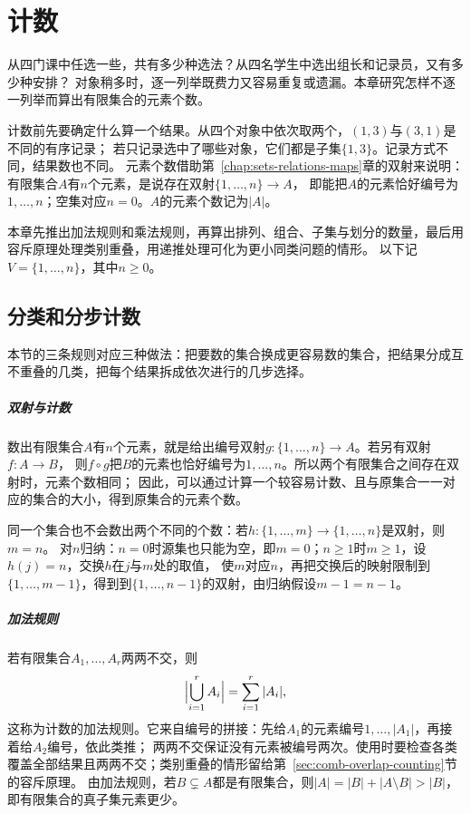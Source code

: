 \chapter{计数}
\label{chap:combinatorics}
\label{chap:counting}

从四门课中任选一些，共有多少种选法？从四名学生中选出组长和记录员，又有多少种安排？
对象稍多时，逐一列举既费力又容易重复或遗漏。本章研究怎样不逐一列举而算出有限集合的元素个数。

计数前先要确定什么算一个结果。从四个对象中依次取两个，$(1,3)$与$(3,1)$是不同的有序记录；
若只记录选中了哪些对象，它们都是子集$\{1,3\}$。记录方式不同，结果数也不同。
元素个数借助第~\ref{chap:sets-relations-maps}章的双射来说明：有限集合$A$有$n$个元素，是说存在双射$\{1,\ldots,n\}\to A$，
即能把$A$的元素恰好编号为$1,\ldots,n$；空集对应$n=0$。$A$的元素个数记为$|A|$。

本章先推出加法规则和乘法规则，再算出排列、组合、子集与划分的数量，最后用容斥原理处理类别重叠，用递推处理可化为更小同类问题的情形。
以下记$V=\{1,\ldots,n\}$，其中$n\geq0$。

\section{分类和分步计数}
\label{sec:comb-families-counting}
\label{sec:comb-finite-counting}
\label{sec:comb-decomposition-counting}
\label{sec:comb-classification-products}
\label{sec:comb-classification-counting}

本节的三条规则对应三种做法：把要数的集合换成更容易数的集合，把结果分成互不重叠的几类，把每个结果拆成依次进行的几步选择。

\paragraph{双射与计数}
数出有限集合$A$有$n$个元素，就是给出编号双射$g:\{1,\ldots,n\}\to A$。若另有双射$f:A\to B$，
则$f\circ g$把$B$的元素也恰好编号为$1,\ldots,n$。所以两个有限集合之间存在双射时，元素个数相同；
因此，可以通过计算一个较容易计数、且与原集合一一对应的集合的大小，得到原集合的元素个数。

同一个集合也不会数出两个不同的个数：若$h:\{1,\ldots,m\}\to\{1,\ldots,n\}$是双射，则$m=n$。
对$n$归纳：$n=0$时源集也只能为空，即$m=0$；$n\geq1$时$m\geq1$，设$h(j)=n$，交换$h$在$j$与$m$处的取值，
使$m$对应$n$，再把交换后的映射限制到$\{1,\ldots,m-1\}$，得到到$\{1,\ldots,n-1\}$的双射，由归纳假设$m-1=n-1$。

\paragraph{加法规则}
若有限集合$A_1,\ldots,A_r$两两不交，则
\[
 \Bigl|\bigcup_{i=1}^r A_i\Bigr|=\sum_{i=1}^r|A_i|,
\]
这称为计数的加法规则。它来自编号的拼接：先给$A_1$的元素编号$1,\ldots,|A_1|$，再接着给$A_2$编号，依此类推；
两两不交保证没有元素被编号两次。使用时要检查各类覆盖全部结果且两两不交；类别重叠的情形留给第~\ref{sec:comb-overlap-counting}节的容斥原理。
由加法规则，若$B\subsetneq A$都是有限集合，则$|A|=|B|+|A\setminus B|>|B|$，即有限集合的真子集元素更少。

